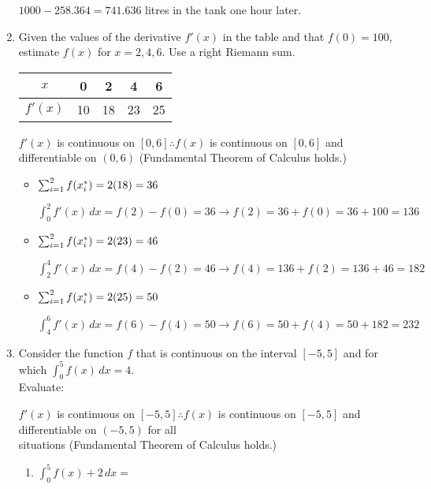 \documentclass[10pt, letterpaper]{report}
\begin{document}
\begin{enumerate}
		$1000-258.364=741.636$ litres in the tank one hour later. \\
	\item{Given the values of the derivative $f'(x)$ in the table and that $f(0)=100$, estimate $f(x)$ for $x=2,4,6$. Use a right Riemann sum.
		\begin{center}
			\begin{tabular}{| c | c | c | c | c |}
				\hline
					$x$ & 0 & 2 & 4 & 6 \\
				\hline
					$f'(x)$ & 10 & 18 & 23 & 25 \\
				\hline
			\end{tabular}
		\end{center}}

    $f'(x)$ is continuous on $[0,6] \therefore f(x)$ is continuous on $[0,6]$ and differentiable on $(0,6)$ (Fundamental Theorem of Calculus holds.) \\

    \begin{itemize}
      \item{$\sum_{i=1}^{2}{f(x_{i}^{*})}=2(18)=36 \\$

        $\int_{0}^{2}{f'(x)}\,dx=
        f(2)-f(0)=36\rightarrow
        f(2)=36+f(0)=36+100=136$}
      \item{$\sum_{i=1}^{2}{f(x_{i}^{*})}=2(23)=46 \\$

        $\int_{2}^{4}{f'(x)}\,dx=
        f(4)-f(2)=46\rightarrow
        f(4)=136+f(2)=136+46=182$}
      \item{$\sum_{i=1}^{2}{f(x_{i}^{*})}=2(25)=50 \\$

        $\int_{4}^{6}{f'(x)}\,dx=
        f(6)-f(4)=50\rightarrow
        f(6)=50+f(4)=50+182=232$}
    \end{itemize}
\pagebreak
	\item{Consider the function $f$ that is continuous on the interval $[-5,5]$ and for which $\int_{0}^{5}{f(x)}\,dx=4$. \\ Evaluate:\\}

    $f'(x)$ is continuous on $[-5,5] \therefore f(x)$ is continuous on $[-5,5]$ and differentiable on $(-5,5)$ for all \\ situations (Fundamental Theorem of Calculus holds.) \\

		\begin{enumerate}
			\item{$\int_{0}^{5}{f(x)+2}\,dx=$\\}


\end{enumerate}
\end{enumerate}
\end{document}
